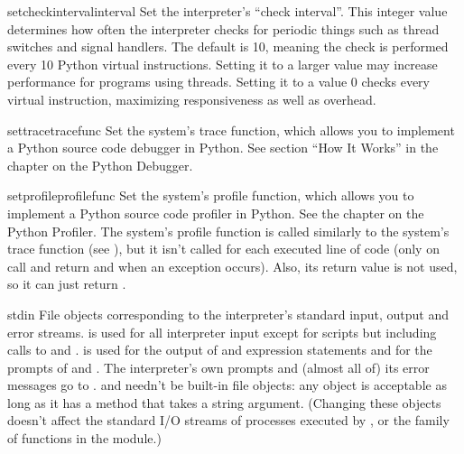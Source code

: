 \begin{funcdesc}{setcheckinterval}{interval}
Set the interpreter's ``check interval''.  This integer value
determines how often the interpreter checks for periodic things such
as thread switches and signal handlers.  The default is 10, meaning
the check is performed every 10 Python virtual instructions.  Setting
it to a larger value may increase performance for programs using
threads.  Setting it to a value \code{<=} 0 checks every virtual instruction,
maximizing responsiveness as well as overhead.
\end{funcdesc}

\begin{funcdesc}{settrace}{tracefunc}
  Set the system's trace function, which allows you to implement a
  Python source code debugger in Python.  See section ``How It Works''
  in the chapter on the Python Debugger.
\end{funcdesc}

\begin{funcdesc}{setprofile}{profilefunc}
  Set the system's profile function, which allows you to implement a
  Python source code profiler in Python.  See the chapter on the
  Python Profiler.  The system's profile function
  is called similarly to the system's trace function (see
  ), but it isn't called for each executed line of
  code (only on call and return and when an exception occurs).  Also,
  its return value is not used, so it can just return .
\end{funcdesc}

\begin{datadesc}{stdin}
  File objects corresponding to the interpreter's standard input,
  output and error streams.   is used for all
  interpreter input except for scripts but including calls to
   and .   is used
  for the output of  and expression statements and for the
  prompts of  and .  The interpreter's
  own prompts and (almost all of) its error messages go to
  .   and  needn't
  be built-in file objects: any object is acceptable as long as it has
  a  method that takes a string argument.  (Changing these
  objects doesn't affect the standard I/O streams of processes
  executed by ,  or the 
  family of functions in the  module.)
\end{datadesc}

